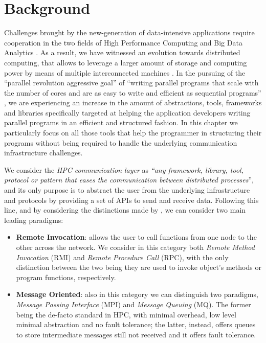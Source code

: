 \chapter{Background}
\label{chap:background}
Challenges brought by the new-generation of data-intensive applications require cooperation in the two fields of High Performance Computing and Big Data Analytics \cite{exa-big}. As a result, we have witnessed an evolution towards distributed computing, that allows to leverage a larger amount of storage and computing power by means of multiple interconnected machines  \cite{survey-distributed}. In the pursuing of the ``parallel revolution aggressive goal'' of ``writing parallel programs that scale with the number of cores and are as easy to write and efficient as sequential programs'' \cite{parallel-computing}, we are experiencing an increase in the amount of abstractions, tools, frameworks and libraries specifically targeted at helping the application developers writing parallel programs in an efficient and structured fashion. In this chapter we particularly focus on all those tools that help the programmer in structuring their programs without being required to handle the underlying communication infrastructure challenges.\newline

We consider the \textit{HPC communication layer} as \textit{``any framework, library, tool, protocol or pattern that eases the communication between distributed processes}'', and its only purpose is to abstract the user from the underlying infrastructure and protocols by providing a set of APIs to send and receive data. Following this line, and by considering the distinctions made by \cite{survey-distributed}, we can consider two main leading paradigms:
\begin{itemize}
	\item \textbf{Remote Invocation}: allows the user to call functions from one node to the other across the network. We consider in this category both \textit{Remote Method Invocation} (RMI) and \textit{Remote Procedure Call} (RPC), with the only distinction between the two being they are used to invoke object's methods or program functions, respectively. 
	\item \textbf{Message Oriented}: also in this category we can distinguish two paradigms, \textit{Message Passing Interface} (MPI) and \textit{Message Queuing} (MQ). The former being the de-facto standard in HPC, with minimal overhead, low level minimal abstraction and no fault tolerance; the latter, instead, offers queues to store intermediate messages still not received and it offers fault tolerance. 
\end{itemize}

